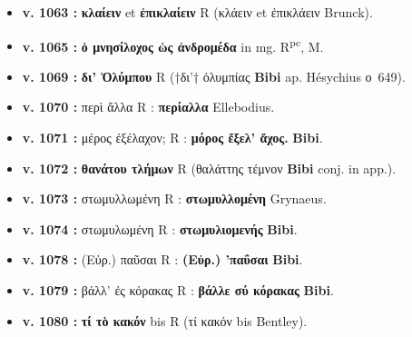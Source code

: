 \documentclass[10pt, a4paper, twoside]{book}
\renewcommand{\_}{\origunderscore\penalty0\relax}
\providecommand{\lecon}[1]{\textbf{#1}}
\providecommand{\expo}[1]{\textsuperscript{#1}}
\providecommand{\Rpc}{R\expo{pc}}
\providecommand{\Mon}{M}
\begin{document}
\begin{itemize}
\begin{itemize}
    \item \textbf{v. 1063 :} \lecon{κλαίειν} et \lecon{ἐπικλαίειν} R (κλάειν et ἐπικλάειν Brunck).
    \item \textbf{v. 1065 :} \lecon{ὁ μνησίλοχος ὡς ἀνδρομέδα} in mg. \Rpc{}, \Mon{}.
    \item \textbf{v. 1069 :} \lecon{δι' Ὀλύμπου} R (†δι'† ὀλυμπίας \lecon{Bibi} ap. Hésychius ο~649).
    \item \textbf{v. 1070 :} περὶ ἄλλα R : \lecon{περίαλλα} Ellebodius.
    \item \textbf{v. 1071 :} μέρος ἐξέλαχον; R : \lecon{μόρος ἔξελ' ἄχος.} \lecon{Bibi}.
    \item \textbf{v. 1072 :} \lecon{θανάτου τλήμων} R (θαλάττης τέμνον \lecon{Bibi} conj. in app.).
    \item \textbf{v. 1073 :} στωμυλλωμένη R : \lecon{στωμυλλομένη} Grynaeus.
    \item \textbf{v. 1074 :} στωμυλωμένη R : \lecon{στωμυλιομενής} \lecon{Bibi}.
    \item \textbf{v. 1078 :} (Εὐρ.) παῦσαι R : \lecon{(Εὐρ.) 'παΰσαι} \lecon{Bibi}.
    \item \textbf{v. 1079 :} βάλλ' ἐς κόρακας R : \lecon{βάλλε σύ κόρακας} \lecon{Bibi}.
    \item \textbf{v. 1080 :} \lecon{τί τὸ κακόν} bis R (τί κακόν bis Bentley).
  \end{itemize}
\end{itemize}
\end{document}
